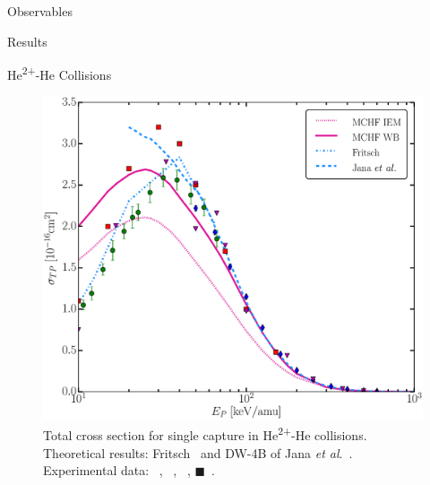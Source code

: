 \documentclass[letterpaper, 11 pt]{report}
\begin{document}
\begin{chapter}{Observables \label{chap:p-he2p-he}}
\begin{section}{Results \label{sec:phe2p-res}}
\begin{subsection}{\texorpdfstring{He\textsuperscript{2+}}{He2+}-He Collisions 
                         \label{sec:he2phe-res}}
\begin{figure}[ht]
\begin{minipage}{.49\linewidth}
               \centering
               \includegraphics[width = \linewidth]{./images/he2phe/he2phe-TP.eps}
               \caption[Total cross section for single capture in He\textsuperscript{2+}-He
                        collisions.]{Total cross section for single capture in He\textsuperscript{2+}-He
                        collisions. Theoretical results: Fritsch~\cite{Fritsch-94} and DW-4B of Jana
                        \textit{et al}.~\cite{JMP-15}.
                        Experimental data: {\color{blue}{$\blacklozenge$}}~\cite{SG85},
                        {\color{OliveGreen}{$\bullet$}}~\cite{SG89},
                        {\color{RedViolet}{$\blacktriangledown$}}~\cite{Dubois87},
                        {\color{red}$\blacksquare$}~\cite{Rudd85}. \label{fig:he2phe-tp}}
            \end{minipage}
         \end{figure}
         

\end{subsection}
\end{section}
\end{chapter}
\end{document}
